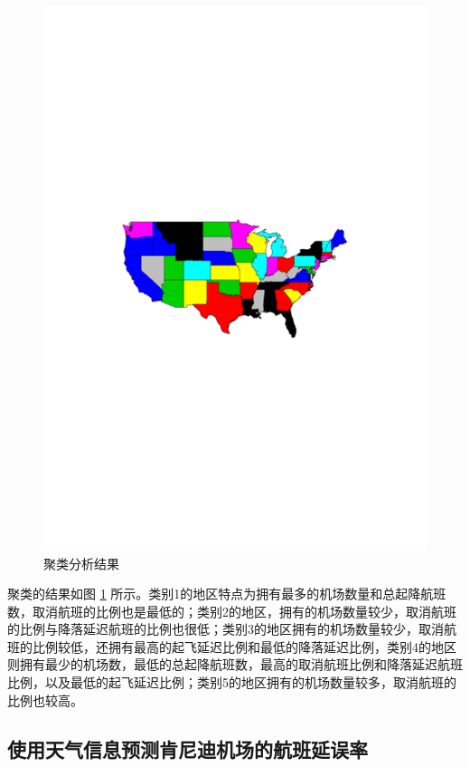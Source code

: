\documentclass[12pt,a4paper,onecolumn]{article}
\begin{document}
\begin{figure}[H]
	\centering
	\includegraphics[width=400pt]{聚类分析.pdf}
	\caption{聚类分析结果}
  \label{聚类分析}
\end{figure}

聚类的结果如图 \ref{聚类分析} 所示。类别1的地区特点为拥有最多的机场数量和总起降航班数，取消航班的比例也是最低的；类别2的地区，拥有的机场数量较少，取消航班的比例与降落延迟航班的比例也很低；类别3的地区拥有的机场数量较少，取消航班的比例较低，还拥有最高的起飞延迟比例和最低的降落延迟比例，类别4的地区则拥有最少的机场数，最低的总起降航班数，最高的取消航班比例和降落延迟航班比例，以及最低的起飞延迟比例；类别5的地区拥有的机场数量较多，取消航班的比例也较高。

\subsection{使用天气信息预测肯尼迪机场的航班延误率}
\end{document}
